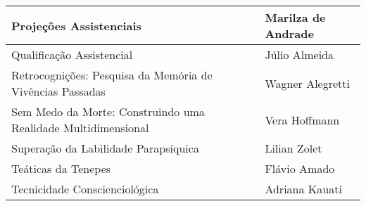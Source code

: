 \documentclass{gescons}
\begin{document}
\begin{longtable}[]{@{}
  >{\raggedright\arraybackslash}p{}
  >{\raggedright\arraybackslash}p{}@{}}
\hline
\begin{minipage}[b]{\linewidth}\raggedright
Projeções Assistenciais
\end{minipage} & \begin{minipage}[b]{\linewidth}\raggedright
Marilza de Andrade
\end{minipage} \\
\hline
\begin{minipage}[b]{\linewidth}\raggedright
Qualificação Assistencial
\end{minipage} & \begin{minipage}[b]{\linewidth}\raggedright
Júlio Almeida
\end{minipage} \\
\hline
\begin{minipage}[b]{\linewidth}\raggedright
Retrocognições: Pesquisa da Memória de Vivências Passadas
\end{minipage} & \begin{minipage}[b]{\linewidth}\raggedright
Wagner Alegretti
\end{minipage} \\
\hline
\begin{minipage}[b]{\linewidth}\raggedright
Sem Medo da Morte: Construindo uma Realidade Multidimensional
\end{minipage} & \begin{minipage}[b]{\linewidth}\raggedright
Vera Hoffmann
\end{minipage} \\
\hline
\begin{minipage}[b]{\linewidth}\raggedright
Superação da Labilidade Parapsíquica
\end{minipage} & \begin{minipage}[b]{\linewidth}\raggedright
Lilian Zolet
\end{minipage} \\
\hline
\begin{minipage}[b]{\linewidth}\raggedright
Teáticas da Tenepes
\end{minipage} & \begin{minipage}[b]{\linewidth}\raggedright
Flávio Amado
\end{minipage} \\
\hline
\begin{minipage}[b]{\linewidth}\raggedright
Tecnicidade Conscienciológica
\end{minipage} & \begin{minipage}[b]{\linewidth}\raggedright
Adriana Kauati
\end{minipage} \\

\end{longtable}
\end{document}
